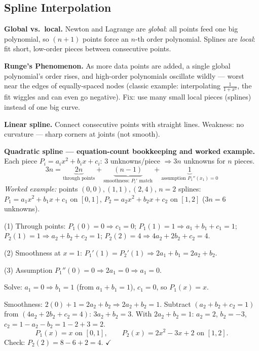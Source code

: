 \subsection{Spline Interpolation}

\begin{defbox}
\textbf{Global vs.\ local.} Newton and Lagrange are \emph{global}: all points feed one big polynomial, so $(n+1)$ points force an $n$-th order polynomial. Splines are \emph{local}: fit short, low-order pieces between consecutive points.
\end{defbox}

\textbf{Runge's Phenomenon.} As more data points are added, a single global polynomial's order rises, and high-order polynomials oscillate wildly — worst near the edges of equally-spaced nodes (classic example: interpolating $\frac{1}{1+x^2}$, the fit wiggles and can even go negative). Fix: use many small local pieces (splines) instead of one big curve.

\textbf{Linear spline.} Connect consecutive points with straight lines. Weakness: no curvature — sharp corners at joints (not smooth).

\begin{examplebox}
\textbf{Quadratic spline — equation-count bookkeeping and worked example.} Each piece $P_i=a_ix^2+b_ix+c_i$: 3 unknowns/piece $\Rightarrow 3n$ unknowns for $n$ pieces.
\[
3n = \underbrace{2n}_{\text{through points}} + \underbrace{(n-1)}_{\text{smoothness: }P_i'\text{ match}} + \underbrace{1}_{\text{assumption } P_1''(x_1)=0}
\]
\emph{Worked example:} points $(0,0),(1,1),(2,4)$, $n=2$ splines: $P_1=a_1x^2+b_1x+c_1$ on $[0,1]$, $P_2=a_2x^2+b_2x+c_2$ on $[1,2]$ ($3n=6$ unknowns).

(1) Through points: $P_1(0)=0\Rightarrow c_1=0$; $P_1(1)=1\Rightarrow a_1+b_1+c_1=1$; $P_2(1)=1\Rightarrow a_2+b_2+c_2=1$; $P_2(2)=4\Rightarrow 4a_2+2b_2+c_2=4$.

(2) Smoothness at $x=1$: $P_1'(1)=P_2'(1) \Rightarrow 2a_1+b_1=2a_2+b_2$.

(3) Assumption $P_1''(0)=0 \Rightarrow 2a_1=0 \Rightarrow a_1=0$.

Solve: $a_1=0\Rightarrow b_1=1$ (from $a_1+b_1=1$), $c_1=0$, so $P_1(x)=x$.

Smoothness: $2(0)+1 = 2a_2+b_2 \Rightarrow 2a_2+b_2=1$. Subtract $(a_2+b_2+c_2=1)$ from $(4a_2+2b_2+c_2=4)$: $3a_2+b_2=3$. With $2a_2+b_2=1$: $a_2=2$, $b_2=-3$, $c_2=1-a_2-b_2=1-2+3=2$.
\[
P_1(x)=x \text{ on } [0,1], \qquad P_2(x)=2x^2-3x+2 \text{ on } [1,2].
\]
Check: $P_2(2)=8-6+2=4$. $\checkmark$
\end{examplebox}

